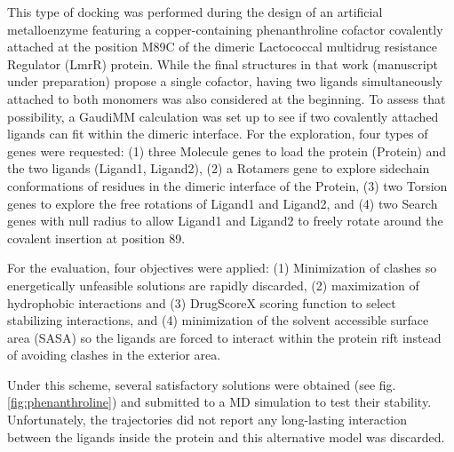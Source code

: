 This type of docking was performed during the design of an artificial metalloenzyme featuring a copper-containing phenanthroline cofactor covalently attached at the position M89C of the dimeric Lactococcal multidrug resistance Regulator (LmrR) protein. While the final structures in that work (manuscript under preparation) propose a single cofactor, having two ligands simultaneously attached to both monomers was also considered at the beginning. To assess that possibility, a GaudiMM calculation was set up to see if two covalently attached ligands can fit within the dimeric interface. For the exploration, four types of genes were requested: (1) three Molecule genes to load the protein (Protein) and the two ligands (Ligand1, Ligand2), (2) a Rotamers gene to explore sidechain conformations of residues in the dimeric interface of the Protein, (3) two Torsion genes to explore the free rotations of Ligand1 and Ligand2, and (4) two Search genes with null radius to allow Ligand1 and Ligand2 to freely rotate around the covalent insertion at position 89.

For the evaluation, four objectives were applied: (1) Minimization of clashes so energetically unfeasible solutions are rapidly discarded, (2) maximization of hydrophobic interactions and (3) DrugScoreX scoring function to select stabilizing interactions, and (4) minimization of the solvent accessible surface area (SASA) so the ligands are forced to interact within the protein rift instead of avoiding clashes in the exterior area.


Under this scheme, several satisfactory solutions were obtained (see fig. \ref{fig:phenanthroline}) and submitted to a MD simulation to test their stability. Unfortunately, the trajectories did not report any long-lasting interaction between the ligands inside the protein and this alternative model was discarded.

